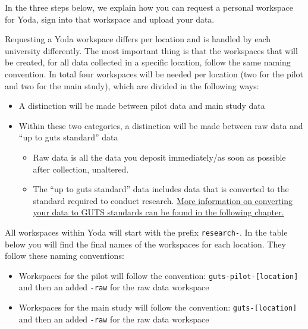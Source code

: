 \documentclass[
  letterpaper,
  DIV=11,
  numbers=noendperiod]{scrreprt}
\begin{document}
In the three steps below, we explain how you can request a personal
workspace for Yoda, sign into that workspace and upload your data.

\begin{tcolorbox}[enhanced jigsaw, arc=.35mm, left=2mm, colbacktitle=quarto-callout-tip-color!10!white, bottomtitle=1mm, toptitle=1mm, titlerule=0mm, leftrule=.75mm, breakable, colframe=quarto-callout-tip-color-frame, colback=white, opacitybacktitle=0.6, coltitle=black, opacityback=0, rightrule=.15mm, toprule=.15mm, bottomrule=.15mm, title={1. Requesting Yoda workspace}]

Requesting a Yoda workspace differs per location and is handled by each
university differently. The most important thing is that the workspaces
that will be created, for all data collected in a specific location,
follow the same naming convention. In total four workspaces will be
needed per location (two for the pilot and two for the main study),
which are divided in the following ways:

\begin{itemize}
\item
  A distinction will be made between pilot data and main study data
\item
  Within these two categories, a distinction will be made between raw
  data and ``up to guts standard'' data

  \begin{itemize}
  \item
    Raw data is all the data you deposit immediately/as soon as possible
    after collection, unaltered.
  \item
    The ``up to guts standard'' data includes data that is converted to
    the standard required to conduct research.
    \href{how-to-save-your-data.qmd}{More information on converting your
    data to GUTS standards can be found in the following chapter.}
  \end{itemize}
\end{itemize}

All workspaces within Yoda will start with the prefix
\texttt{research-}. In the table below you will find the final names of
the workspaces for each location. They follow these naming conventions:

\begin{itemize}
\item
  Workspaces for the pilot will follow the convention:
  \texttt{guts-pilot-{[}location{]}} and then an added \texttt{-raw} for
  the raw data workspace
\item
  Workspaces for the main study will follow the convention:
  \texttt{guts-{[}location{]}} and then an added \texttt{-raw} for the
  raw data workspace


\end{itemize}
\end{tcolorbox}
\end{document}
